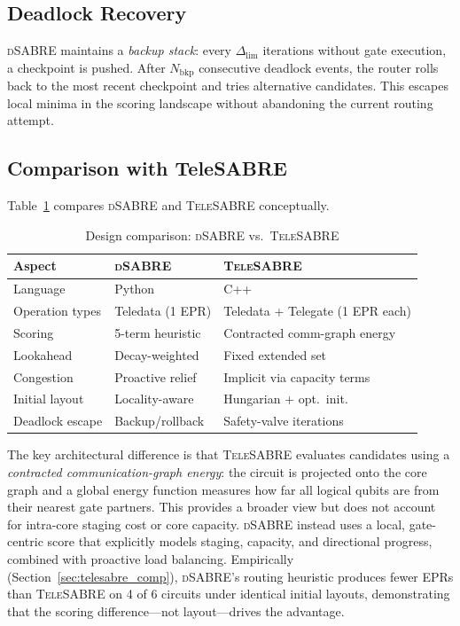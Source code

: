 \documentclass[conference]{IEEEtran}
\newcommand{\dSABRE}{\textsc{dSABRE}}
\newcommand{\TeleSABRE}{\textsc{TeleSABRE}}
\begin{document}
\subsection{Deadlock Recovery}

\dSABRE{} maintains a \emph{backup stack}: every $\Delta_{\mathrm{lim}}$
iterations without gate execution, a checkpoint is pushed.
After $N_{\mathrm{bkp}}$ consecutive deadlock events, the router rolls back
to the most recent checkpoint and tries alternative candidates.
This escapes local minima in the scoring landscape without abandoning the
current routing attempt.

\subsection{Comparison with TeleSABRE}

Table~\ref{tab:dsabre_vs_ts} compares \dSABRE{} and \TeleSABRE{} conceptually.

\begin{table}[t]
\centering
\caption{Design comparison: \dSABRE{} vs.\ \TeleSABRE{}}
\label{tab:dsabre_vs_ts}
\setlength{\tabcolsep}{4pt}
\begin{tabular}{@{}lll@{}}
\toprule
Aspect & \dSABRE{} & \TeleSABRE{} \\
\midrule
Language         & Python                 & C++ \\
Operation types  & Teledata (1 EPR)       & Teledata + Telegate (1 EPR each) \\
Scoring          & 5-term heuristic       & Contracted comm-graph energy \\
Lookahead        & Decay-weighted         & Fixed extended set \\
Congestion       & Proactive relief       & Implicit via capacity terms \\
Initial layout   & Locality-aware         & Hungarian + opt.\ init.\ \\
Deadlock escape  & Backup/rollback        & Safety-valve iterations \\
\bottomrule
\end{tabular}
\end{table}

The key architectural difference is that \TeleSABRE{} evaluates candidates
using a \emph{contracted communication-graph energy}: the circuit is projected
onto the core graph and a global energy function measures how far all logical
qubits are from their nearest gate partners.
This provides a broader view but does not account for intra-core staging cost
or core capacity.
\dSABRE{} instead uses a local, gate-centric score that explicitly models
staging, capacity, and directional progress, combined with proactive load
balancing.
Empirically (Section~\ref{sec:telesabre_comp}), \dSABRE{}'s routing heuristic
produces fewer EPRs than \TeleSABRE{} on 4 of 6 circuits under identical
initial layouts, demonstrating that the scoring difference---not layout---drives
the advantage.
\end{document}
